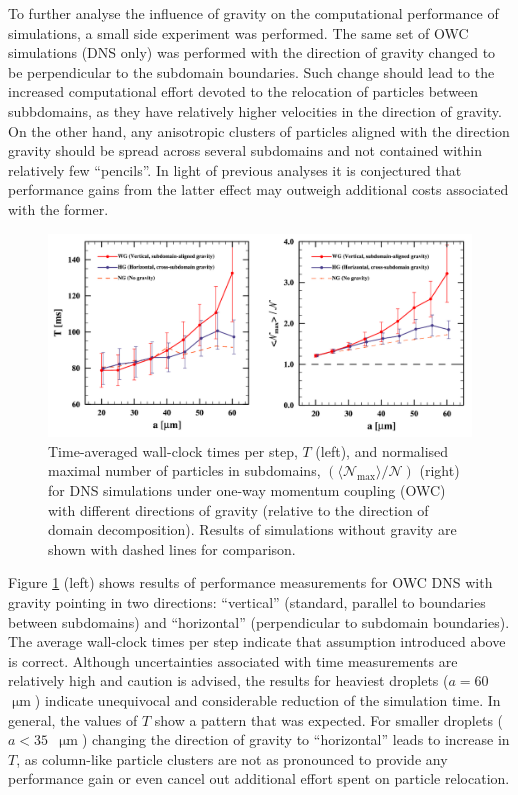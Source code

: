 \documentclass{pracamgren}
\begin{document}
\medskip

To further analyse the influence of gravity on the computational performance of simulations, a small side experiment was performed.
The same set of OWC simulations (DNS only) was performed with the direction of gravity changed to be perpendicular to the subdomain boundaries.
Such change should lead to the increased computational effort devoted to the relocation of particles between subbdomains, as they have relatively higher velocities in the direction of gravity.
On the other hand, any anisotropic clusters of particles aligned with the direction gravity should be spread across several subdomains and not contained within relatively few ``pencils''.
In light of previous analyses it is conjectured that performance gains from the latter effect may outweigh additional costs associated with the former.

\begin{figure}[ht]
\centering
\includegraphics[width=13.5cm]{figures/3-21_howcperf.pdf}
\caption{
Time-averaged wall-clock times per step, $T$ (left), and normalised maximal number of particles in subdomains, $(\langle \mathcal{N}_{\max} \rangle / \mathcal{N})$ (right) for DNS simulations under one-way momentum coupling (OWC) with different directions of gravity (relative to the direction of domain decomposition).
Results of simulations without gravity are shown with dashed lines for comparison. 
}
\label{fig:howcperf}
\end{figure}

Figure \ref{fig:howcperf} (left) shows results of performance measurements for OWC DNS with gravity pointing in two directions: ``vertical'' (standard, parallel to boundaries between subdomains) and ``horizontal'' (perpendicular to subdomain boundaries).
The average wall-clock times per step indicate that assumption introduced above is correct.
Although uncertainties associated with time measurements are relatively high and caution is advised, the results for heaviest droplets ($a = 60$~$\upmu\text{m}$) indicate unequivocal and considerable reduction of the simulation time.
In general, the values of $T$ show a pattern that was expected.
For smaller droplets ($a < 35$~$\upmu\text{m}$) changing the direction of gravity to ``horizontal'' leads to increase in $T$, as column-like particle clusters are not as pronounced to provide any performance gain or even cancel out additional effort spent on particle relocation.   
\end{document}
